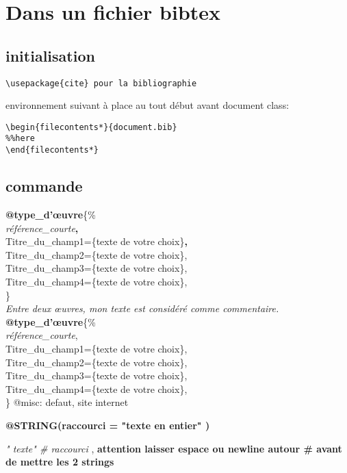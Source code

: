 \chapter{Dans un fichier bibtex}

\section{initialisation}
\begin{verbatim}
\usepackage{cite} pour la bibliographie
\end{verbatim}

environnement suivant à place au tout début avant document class:
\begin{verbatim}
\begin{filecontents*}{document.bib}
%%here
\end{filecontents*}
\end{verbatim}

\section{commande}

\textbf{@type\_d'œuvre}\{\%\\
\textsl{référence\_courte}\textbf{,} \\
Titre\_du\_champ1=\{texte de votre choix\}\textbf{,} \\
Titre\_du\_champ2=\{texte de votre choix\},\\
Titre\_du\_champ3=\{texte de votre choix\},\\
Titre\_du\_champ4=\{texte de votre choix\},\\
\}\\
\textit{Entre deux œuvres, mon texte est considéré comme commentaire.\\}
\textbf{@type\_d'œuvre}\{\%
\\\textsl{référence\_courte},\\
Titre\_du\_champ1=\{texte de votre choix\},\\
Titre\_du\_champ2=\{texte de votre choix\},\\
Titre\_du\_champ3=\{texte de votre choix\},\\
Titre\_du\_champ4=\{texte de votre choix\},\\
\}
@misc: defaut, site internet

\textbf{@STRING(raccourci = "texte en entier" )}

\textit{" texte" \# raccourci }, \textbf{attention laisser espace ou newline autour \# avant de mettre les 2 strings}

